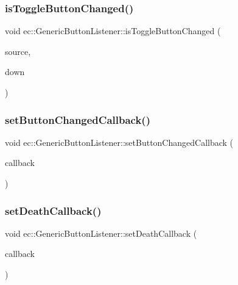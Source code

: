 \subsubsection{\texorpdfstring{is\+Toggle\+Button\+Changed()}{isToggleButtonChanged()}}
{\footnotesize\ttfamily void ec\+::\+Generic\+Button\+Listener\+::is\+Toggle\+Button\+Changed (\begin{DoxyParamCaption}\item[{agui\+::\+Button $\ast$}]{source,  }\item[{bool}]{down }\end{DoxyParamCaption})\hspace{0.3cm}{\ttfamily [override]}}

\mbox{\label{classec_1_1_generic_button_listener_a477874968f1f815d0d794b4b0f8a0b9e}} 
\subsubsection{\texorpdfstring{set\+Button\+Changed\+Callback()}{setButtonChangedCallback()}}
{\footnotesize\ttfamily void ec\+::\+Generic\+Button\+Listener\+::set\+Button\+Changed\+Callback (\begin{DoxyParamCaption}\item[{const \mbox{\hyperlink{classec_1_1_generic_button_listener_af89147c1baeadae9155f5d4e0df7abf3}{Button\+Changed\+\_\+\+Callback}} \&}]{callback }\end{DoxyParamCaption})}

\mbox{\label{classec_1_1_generic_button_listener_ab44a076729d26fc80ae05fc155c735a1}} 
\subsubsection{\texorpdfstring{set\+Death\+Callback()}{setDeathCallback()}}
{\footnotesize\ttfamily void ec\+::\+Generic\+Button\+Listener\+::set\+Death\+Callback (\begin{DoxyParamCaption}\item[{const \mbox{\hyperlink{classec_1_1_generic_button_listener_aa7ca8b30098ab89eff663950d25a13eb}{Death\+\_\+\+Callback}} \&}]{callback }\end{DoxyParamCaption})}

